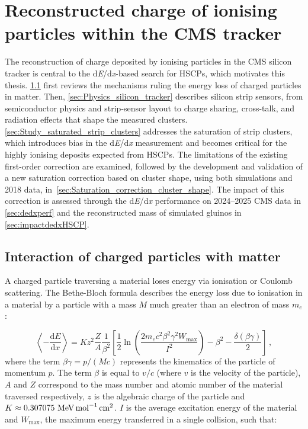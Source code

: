 \chapter{Reconstructed charge of ionising particles within the CMS tracker}
\label{ch:chapitre2}
\minitoc

The reconstruction of charge deposited by ionising particles in the CMS silicon tracker is central to the d\textit{E}/d\textit{x}-based search for HSCPs, which motivates this thesis. \cref{sec:interactionWithMatter} first reviews the mechanisms ruling the energy loss of charged particles in matter. Then, \cref{sec:Physics_silicon_tracker} describes silicon strip sensors, from semiconductor physics and strip-sensor layout to charge sharing, cross-talk, and radiation effects that shape the measured clusters. \cref{sec:Study_saturated_strip_clusters} addresses the saturation of strip clusters, which introduces bias in the d\textit{E}/d\textit{x} measurement and becomes critical for the highly ionising deposits expected from HSCPs. The limitations of the existing first-order correction are examined, followed by the development and validation of a new saturation correction based on cluster shape, using both simulations and 2018 data, in~\cref{sec:Saturation_correction_cluster_shape}. The impact of this correction is assessed through the d\textit{E}/d\textit{x} performance on 2024--2025 CMS data in \cref{sec:dedxperf} and the reconstructed mass of simulated gluinos in \cref{sec:impactdedxHSCP}.

\section{Interaction of charged particles with matter}
\label{sec:interactionWithMatter}

\indent A charged particle traversing a material loses energy via ionisation or Coulomb scattering. The Bethe-Bloch formula describes the energy loss due to ionisation in a material by a particle with a mass $M$ much greater than an electron of mass $m_e$ \cite{PDG}:

\begin{equation} 
    \left\langle - \frac{\mathrm{d}E}{\mathrm{d}x} \right\rangle = Kz^2 \frac{Z}{A} \frac{1}{\beta^2} \left[ \frac{1}{2} \ln \left( \frac{2m_ec^2\beta^2\gamma^2W_{\mathrm{max}}}{I^2} \right) - \beta^2 - \frac{\delta(\beta\gamma)}{2} \right] \, ,
    \label{eq:BetheBloch_formula}
\end{equation}
where the term $\beta\gamma= p/(Mc)$ represents the kinematics of the particle of momentum $p$. The term $\beta$ is equal to $v/c$ (where $v$ is the velocity of the particle), $A$ and $Z$ correspond to the mass number and atomic number of the material traversed respectively, $z$ is the algebraic charge of the particle and $K \approx 0.307075 \,\, \textrm{MeV\,mol}^{-1}\,\textrm{cm}^2$. $I$ is the average excitation energy of the material and $W_{\mathrm{max}}$, the maximum energy transferred in a single collision, such that:

